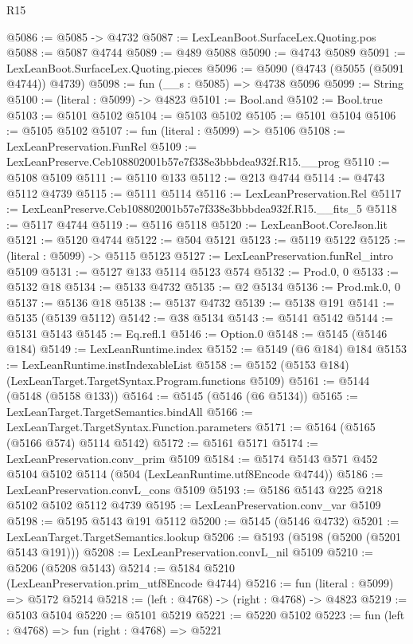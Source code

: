 \begin{lexlean}{R15}
\begin{coremodule}
{{{{{{{{{{{@5086 := @5085 -> @4732
@5087 := LexLeanBoot.SurfaceLex.Quoting.pos
@5088 := @5087 @4744
@5089 := @489 @5088
@5090 := @4743 @5089
@5091 := LexLeanBoot.SurfaceLex.Quoting.pieces
@5096 := @5090 (@4743 (@5055 (@5091 @4744)) @4739)
@5098 := fun (__s : @5085) => @4738 @5096
@5099 := String
@5100 := (literal : @5099) -> @4823
@5101 := Bool.and
@5102 := Bool.true
@5103 := @5101 @5102
@5104 := @5103 @5102
@5105 := @5101 @5104
@5106 := @5105 @5102
@5107 := fun (literal : @5099) => @5106
@5108 := LexLeanPreservation.FunRel
@5109 := LexLeanPreserve.Ceb108802001b57e7f338e3bbbdea932f.R15.__prog
@5110 := @5108 @5109
@5111 := @5110 @133
@5112 := @213 @4744
@5114 := @4743 @5112 @4739
@5115 := @5111 @5114
@5116 := LexLeanPreservation.Rel
@5117 := LexLeanPreserve.Ceb108802001b57e7f338e3bbbdea932f.R15.__fits_5
@5118 := @5117 @4744
@5119 := @5116 @5118
@5120 := LexLeanBoot.CoreJson.lit
@5121 := @5120 @4744
@5122 := @504 @5121
@5123 := @5119 @5122
@5125 := (literal : @5099) -> @5115 @5123
@5127 := LexLeanPreservation.funRel_intro @5109
@5131 := @5127 @133 @5114 @5123 @574
@5132 := Prod.{0, 0}
@5133 := @5132 @18
@5134 := @5133 @4732
@5135 := @2 @5134
@5136 := Prod.mk.{0, 0}
@5137 := @5136 @18
@5138 := @5137 @4732
@5139 := @5138 @191
@5141 := @5135 (@5139 @5112)
@5142 := @38 @5134
@5143 := @5141 @5142
@5144 := @5131 @5143
@5145 := Eq.refl.{1}
@5146 := Option.{0}
@5148 := @5145 (@5146 @184)
@5149 := LexLeanRuntime.index
@5152 := @5149 (@6 @184) @184
@5153 := LexLeanRuntime.instIndexableList
@5158 := @5152 (@5153 @184) (LexLeanTarget.TargetSyntax.Program.functions @5109)
@5161 := @5144 (@5148 (@5158 @133))
@5164 := @5145 (@5146 (@6 @5134))
@5165 := LexLeanTarget.TargetSemantics.bindAll
@5166 := LexLeanTarget.TargetSyntax.Function.parameters
@5171 := @5164 (@5165 (@5166 @574) @5114 @5142)
@5172 := @5161 @5171
@5174 := LexLeanPreservation.conv_prim @5109
@5184 := @5174 @5143 @571 @452 @5104 @5102 @5114 (@504 (LexLeanRuntime.utf8Encode @4744))
@5186 := LexLeanPreservation.convL_cons @5109
@5193 := @5186 @5143 @225 @218 @5102 @5102 @5112 @4739
@5195 := LexLeanPreservation.conv_var @5109
@5198 := @5195 @5143 @191 @5112
@5200 := @5145 (@5146 @4732)
@5201 := LexLeanTarget.TargetSemantics.lookup
@5206 := @5193 (@5198 (@5200 (@5201 @5143 @191)))
@5208 := LexLeanPreservation.convL_nil @5109
@5210 := @5206 (@5208 @5143)
@5214 := @5184 @5210 (LexLeanPreservation.prim_utf8Encode @4744)
@5216 := fun (literal : @5099) => @5172 @5214
@5218 := (left : @4768) -> (right : @4768) -> @4823
@5219 := @5103 @5104
@5220 := @5101 @5219
@5221 := @5220 @5102
@5223 := fun (left : @4768) => fun (right : @4768) => @5221
}}}}}}}}}}}
\end{coremodule}
\end{lexlean}
